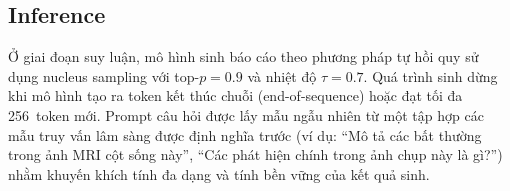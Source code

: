 \subsection{Inference}

Ở giai đoạn suy luận, mô hình sinh báo cáo theo phương pháp tự hồi quy sử dụng nucleus sampling với top-$p = 0.9$ và nhiệt độ $\tau = 0.7$. Quá trình sinh dừng khi mô hình tạo ra token kết thúc chuỗi (end-of-sequence) hoặc đạt tối đa 256~token mới. Prompt câu hỏi được lấy mẫu ngẫu nhiên từ một tập hợp các mẫu truy vấn lâm sàng được định nghĩa trước (ví dụ: ``Mô tả các bất thường trong ảnh MRI cột sống này'', ``Các phát hiện chính trong ảnh chụp này là gì?'') nhằm khuyến khích tính đa dạng và tính bền vững của kết quả sinh.
